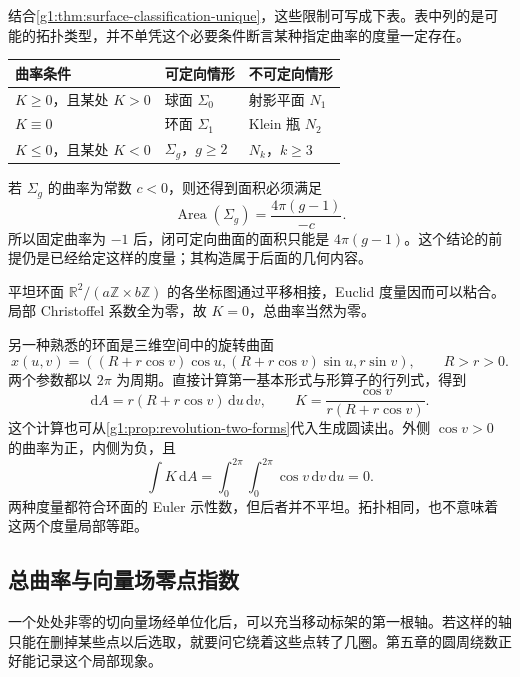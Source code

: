 结合\cref{g1:thm:surface-classification-unique}，这些限制可写成下表。表中列的是可能的拓扑类型，并不单凭这个必要条件断言某种指定曲率的度量一定存在。
\begin{center}
	\begin{tabular}{lll}
		\toprule
		曲率条件 & 可定向情形 & 不可定向情形\\
		\midrule
		\(K\ge0\)，且某处 \(K>0\) & 球面 \(\Sigma_0\) & 射影平面 \(N_1\)\\
		\(K\equiv0\) & 环面 \(\Sigma_1\) & Klein 瓶 \(N_2\)\\
		\(K\le0\)，且某处 \(K<0\) & \(\Sigma_g\)，\(g\ge2\) & \(N_k\)，\(k\ge3\)\\
		\bottomrule
	\end{tabular}
\end{center}

若 \(\Sigma_g\) 的曲率为常数 \(c<0\)，则还得到面积必须满足
\[
	\operatorname{Area}(\Sigma_g)=\frac{4\pi(g-1)}{-c}.
\]
所以固定曲率为 \(-1\) 后，闭可定向曲面的面积只能是 \(4\pi(g-1)\)。这个结论的前提仍是已经给定这样的度量；其构造属于后面的几何内容。

\begin{example}
	\label{g1:exm:two-torus-curvatures}
	平坦环面 \(\mathbb R^2/(a\mathbb Z\times b\mathbb Z)\) 的各坐标图通过平移相接，Euclid 度量因而可以粘合。局部 Christoffel 系数全为零，故 \(K=0\)，总曲率当然为零。

	另一种熟悉的环面是三维空间中的旋转曲面
	\[
		x(u,v)=((R+r\cos v)\cos u,(R+r\cos v)\sin u,r\sin v),\qquad R>r>0.
	\]
	两个参数都以 \(2\pi\) 为周期。直接计算第一基本形式与形算子的行列式，得到
	\[
		\mathrm{d}A=r(R+r\cos v)\,\mathrm{d}u\,\mathrm{d}v,
		\qquad K=\frac{\cos v}{r(R+r\cos v)}.
	\]
	这个计算也可从\cref{g1:prop:revolution-two-forms}代入生成圆读出。外侧 \(\cos v>0\) 的曲率为正，内侧为负，且
	\[
		\int K\,\mathrm{d}A=\int_0^{2\pi}\int_0^{2\pi}\cos v\,\mathrm{d}v\,\mathrm{d}u=0.
	\]
	两种度量都符合环面的 Euler 示性数，但后者并不平坦。拓扑相同，也不意味着这两个度量局部等距。
\end{example}

\subsection{总曲率与向量场零点指数}
\label{g1:subsec:0905:02}

一个处处非零的切向量场经单位化后，可以充当移动标架的第一根轴。若这样的轴只能在删掉某些点以后选取，就要问它绕着这些点转了几圈。第五章的圆周绕数正好能记录这个局部现象。

